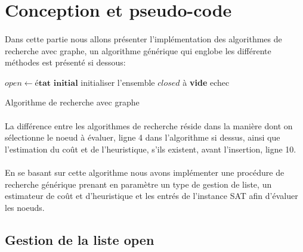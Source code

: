 \section{Conception et pseudo-code}
\paragraph{}
Dans cette partie nous allons présenter l’implémentation des algorithmes de recherche avec graphe, un algorithme générique qui englobe les différente méthodes est présenté si dessous:

\begin{algorithm}
	\SetAlgoLined
	$open \gets \textbf{état initial}$\;
	initialiser l'ensemble $closed$ à \textbf{vide}\;
	\Return echec\;
\caption{Algorithme de recherche avec graphe}
\end{algorithm}
\paragraph{}
La différence entre les algorithmes de recherche réside dans la manière dont on sélectionne le noeud à évaluer, ligne 4 dans l’algorithme si dessus, ainsi que l’estimation du coût et de l’heuristique, s’ils existent, avant l’insertion, ligne 10.\\
\paragraph{}
En se basant sur cette algorithme nous avons implémenter une procédure de recherche générique prenant en paramètre un type de gestion de liste, un estimateur de coût et d’heuristique et les entrés de l’instance SAT afin d’évaluer les noeuds.
\subsection{Gestion de la liste open}
\paragraph{}

